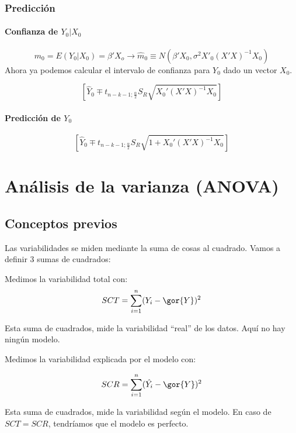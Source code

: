 \subsubsection{Predicción}

\paragraph{Confianza de $Y_0 | X_0$}
\[
m_0 = E(Y_0 | X_0) = β'X_o \to \hat{m}_0 \equiv N\left( β'X_0 , σ^2X'_0(X'X)^{-1}X_0 \right)
\]
Ahora ya podemos calcular el intervalo de confianza para $Y_0$ dado un vector $X_0$.

\[
\left[ \hat{Y}_0 \mp t_{n-k-1;\frac{α}{2}} S_R\sqrt{X_0'(X'X)^{-1}X_0} \right]
\]


\paragraph{Predicción de $Y_0$}

\[
\left[ \hat{Y}_0 \mp t_{n-k-1;\frac{α}{2}} S_R\sqrt{1+X_0'(X'X)^{-1}X_0} \right]
\]

\section{Análisis de la varianza (ANOVA)}

\subsection{Conceptos previos}
Las variabilidades se miden mediante la suma de cosas al cuadrado. Vamos a definir 3 sumas de cuadrados:

\begin{defn}
Medimos la variabilidad total con:
\[SCT = \sum_{i=1}^n (Y_i - \gor{Y})^2\]

Esta suma de cuadrados, mide la variabilidad ``real'' de los datos. Aquí no hay ningún modelo.
\end{defn}

\begin{defn}
Medimos la variabilidad explicada por el modelo con:

\[SCR = \sum_{i=1}^n (\hat{Y_i} - \gor{Y})^2\]

Esta suma de cuadrados, mide la variabilidad según el modelo. En caso de $SCT = SCR$, tendríamos que el modelo es perfecto.
\end{defn}



